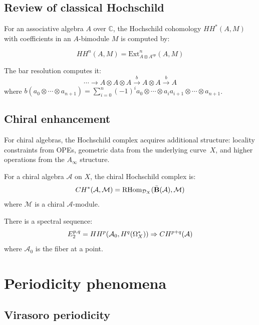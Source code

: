 \subsection{Review of classical Hochschild}

For an associative algebra $A$ over $\mathbb{C}$, the Hochschild cohomology $HH^*(A, M)$ with coefficients in an $A$-bimodule $M$ is computed by:

\[HH^n(A, M) = \text{Ext}^n_{A \otimes A^{op}}(A, M)\]

The bar resolution computes it:
\[\cdots \to A \otimes A \otimes A \xrightarrow{b} A \otimes A \xrightarrow{b} A\]
where $b(a_0 \otimes \cdots \otimes a_{n+1}) = \sum_{i=0}^n (-1)^i a_0 \otimes \cdots \otimes a_ia_{i+1} \otimes \cdots \otimes a_{n+1}$.

\subsection{Chiral enhancement}

For chiral algebras, the Hochschild complex acquires additional
structure: locality constraints from OPEs, geometric data from the
underlying curve~$X$, and higher operations from the $A_\infty$
structure.

\begin{definition}
For a chiral algebra $\mathcal{A}$ on $X$, the chiral Hochschild complex is:
\[CH^*(\mathcal{A}, \mathcal{M}) = \text{RHom}_{\mathcal{D}_X}(\bar{\mathbf{B}}(\mathcal{A}), \mathcal{M})\]
where $\mathcal{M}$ is a chiral $\mathcal{A}$-module.
\end{definition}

\begin{theorem}\label{thm:hochschild-classical-comparison}
There is a spectral sequence:
\[E_2^{p,q} = HH^p(\mathcal{A}_0, H^q(\Omega^*_X)) \Rightarrow CH^{p+q}(\mathcal{A})\]
where $\mathcal{A}_0$ is the fiber at a point.
\end{theorem}

\section{Periodicity phenomena}

\subsection{Virasoro periodicity}

